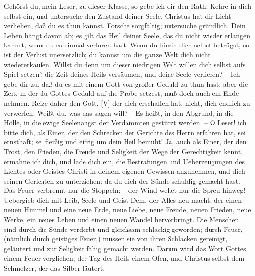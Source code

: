 Gehörst du, mein Leser, zu dieser Klasse, so gebe ich dir den Rath: Kehre in dich selbst ein, und untersuche den Zustand deiner Seele. Christus hat dir Licht verliehen, daß du es thun kannst. Forsche sorgfältig; untersuche gründlich. Dein Leben hängt davon ab; es gilt das Heil deiner Seele, das du nicht wieder erlangen kannst, wenn du es einmal verloren hast. Wenn du hierin dich selbst betrügst, so ist der Verlust unersetzlich; du kannst um die ganze Welt dich nicht wiedererkaufen. Willst du denn um dieser niedrigen Welt willen dich selbst aufs Spiel setzen? die Zeit deines Heils versäumen, und deine Seele verlieren? – Ich gebe dir zu, daß du es mit einem Gott von großer Geduld zu thun hast; aber die Zeit, in der du Gottes Geduld auf die Probe setzest, muß doch auch ein Ende nehmen. Reize daher den Gott, [V] der dich erschaffen hat, nicht, dich endlich zu verwerfen. Weißt du, was das sagen will? – Es heißt, in den Abgrund, in die Hölle, in die ewige Seelenangst der Verdammten gestürzt werden. – O Leser! ich bitte dich, als Einer, der den Schrecken der Gerichte des Herrn erfahren hat, sei ernsthaft; sei fleißig und eifrig um dein Heil bemüht! Ja, auch als Einer, der den Trost, den Frieden, die Freude und Seligkeit der Wege der Gerechtigkeit kennt, ermahne ich dich, und lade dich ein, die Bestrafungen und Ueberzeugungen des Lichtes oder Geistes Christi in deinem eigenen Gewissen anzunehmen, und dich seinen Gerichten zu unterziehen; da du dich der Sünde schuldig gemacht hast. Das Feuer verbrennt nur die Stoppeln; – der Wind wehet nur die Spreu hinweg! Uebergieb dich mit Leib, Seele und Geist Dem, der Alles neu macht; der einen neuen Himmel und eine neue Erde, neue Liebe, neue Freude, neuen Frieden, neue Werke, ein neues Leben und einen neuen Wandel hervorbringt. Die Menschen sind durch die Sünde verderbt und gleichsam schlackig geworden; durch Feuer, (nämlich durch geistiges Feuer,) müssen sie von ihren Schlacken gereinigt, geläutert und zur Seligkeit fähig gemacht werden. Darum wird das Wort Gottes einem Feuer verglichen; der Tag des Heils einem Ofen, und Christus selbst dem Schmelzer, der das Silber läutert.

